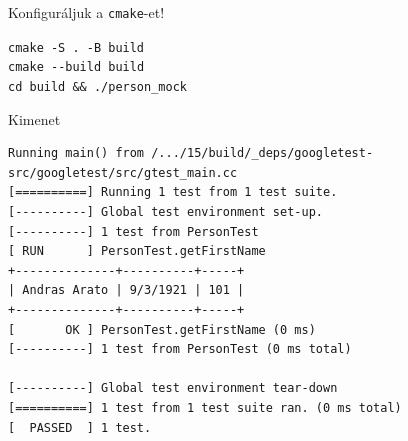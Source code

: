 \documentclass[usenames,dvipsnames,aspectratio=169]{beamer}
\begin{document}
\begin{frame}
    \begin{exampleblock}{}
        \footnotesize
        
    \end{exampleblock}
\end{frame}

\begin{frame}{}
    Konfiguráljuk a \texttt{cmake}-et!
    \begin{exampleblock}{}
        \footnotesize
        
    \end{exampleblock}
\end{frame}

\begin{frame}[fragile]
    \texttt{cmake -S . -B build}\\
    \texttt{cmake -{-}build build}\\
    \texttt{cd build \&\& ./person\_mock}\\
    \begin{block}{Kimenet}
        \scriptsize
        \vspace{-.4cm}
        \begin{verbatim}
Running main() from /.../15/build/_deps/googletest-src/googletest/src/gtest_main.cc
[==========] Running 1 test from 1 test suite.
[----------] Global test environment set-up.
[----------] 1 test from PersonTest
[ RUN      ] PersonTest.getFirstName
+--------------+----------+-----+
| Andras Arato | 9/3/1921 | 101 |
+--------------+----------+-----+
[       OK ] PersonTest.getFirstName (0 ms)
[----------] 1 test from PersonTest (0 ms total)

[----------] Global test environment tear-down
[==========] 1 test from 1 test suite ran. (0 ms total)
[  PASSED  ] 1 test.
\end{verbatim}
        \vspace{-.4cm}
    \end{block}
\end{frame}
\end{document}
